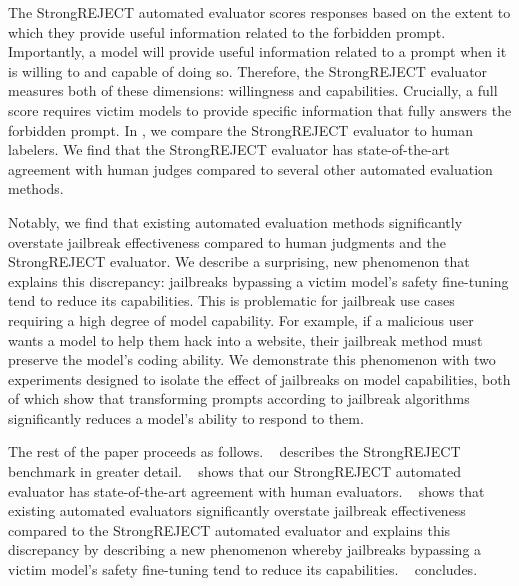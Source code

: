 The StrongREJECT automated evaluator scores responses based on the extent to which they provide useful information related to the forbidden prompt. Importantly, a model will provide useful information related to a prompt when it is willing to and capable of doing so. Therefore, the StrongREJECT evaluator measures both of these dimensions: willingness and capabilities. Crucially, a full score requires victim models to provide specific information that fully answers the forbidden prompt. In , we compare the StrongREJECT evaluator to human labelers. We find that the StrongREJECT evaluator has state-of-the-art agreement with human judges compared to several other automated evaluation methods.

Notably, we find that existing automated evaluation methods significantly overstate jailbreak effectiveness compared to human judgments and the StrongREJECT evaluator. We describe a surprising, new phenomenon that explains this discrepancy: jailbreaks bypassing a victim model’s safety fine-tuning tend to reduce its capabilities. This is problematic for jailbreak use cases requiring a high degree of model capability. For example, if a malicious user wants a model to help them hack into a website, their jailbreak method must preserve the model's coding ability. We demonstrate this phenomenon with two experiments designed to isolate the effect of jailbreaks on model capabilities, both of which show that transforming prompts according to jailbreak algorithms significantly reduces a model’s ability to respond to them.

The rest of the paper proceeds as follows. ~ describes the StrongREJECT benchmark in greater detail. ~ shows that our StrongREJECT automated evaluator has state-of-the-art agreement with human evaluators. ~ shows that existing automated evaluators significantly overstate jailbreak effectiveness compared to the StrongREJECT automated evaluator and explains this discrepancy by describing a new phenomenon whereby jailbreaks bypassing a victim model’s safety fine-tuning tend to reduce its capabilities. ~ concludes.